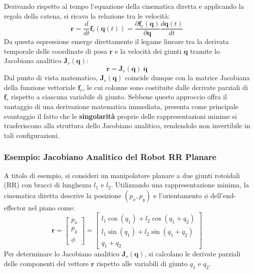 \documentclass[11pt, a4paper]{report}
\begin{document}
Derivando rispetto al tempo l'equazione della cinematica diretta e applicando la regola della catena, si ricava la relazione tra le velocità:
\[
    \dot{\bm{r}} = \frac{d}{dt}\bm{f}_r(\bm{q}(t)) = \frac{\partial \bm{f}_r(\bm{q})}{\partial \bm{q}} \frac{d\bm{q}(t)}{dt}
\]
Da questa espressione emerge direttamente il legame lineare tra la derivata temporale delle coordinate di posa \(\dot{\bm{r}}\) e la velocità dei giunti \(\dot{\bm{q}}\) tramite lo Jacobiano analitico \(\bm{J}_r(\bm{q})\):
\[
    \dot{\bm{r}} = \bm{J}_r(\bm{q}) \; \dot{\bm{q}}
\]
Dal punto di vista matematico, \(\bm{J}_r(\bm{q})\) coincide dunque con la matrice Jacobiana della funzione vettoriale \(\bm{f}_r\), le cui colonne sono costituite dalle derivate parziali di \(\bm{f}_r\) rispetto a ciascuna variabile di giunto. Sebbene questo approccio offra il vantaggio di una derivazione matematica immediata, presenta come principale svantaggio il fatto che le \textbf{singolarità} proprie delle rappresentazioni minime si trasferiscono alla struttura dello Jacobiano analitico, rendendolo non invertibile in tali configurazioni.

\subsubsection{Esempio: Jacobiano Analitico del Robot RR Planare}
A titolo di esempio, si consideri un manipolatore planare a due giunti rotoidali (RR) con bracci di lunghezza \(l_1\) e \(l_2\). Utilizzando una rappresentazione minima, la cinematica diretta descrive la posizione \((p_x, p_y)\) e l'orientamento \(\phi\) dell'end-effector nel piano come:
\[
    \bm{r} = \begin{bmatrix} p_x \\ p_y \\ \phi \end{bmatrix} =
    \begin{bmatrix}
        l_1 \cos(q_1) + l_2 \cos(q_1 + q_2) \\
        l_1 \sin(q_1) + l_2 \sin(q_1 + q_2) \\
        q_1 + q_2
    \end{bmatrix}
\]
Per determinare lo Jacobiano analitico \(\bm{J}_r(\bm{q})\), si calcolano le derivate parziali delle componenti del vettore \(\bm{r}\) rispetto alle variabili di giunto \(q_1\) e \(q_2\).
\end{document}
